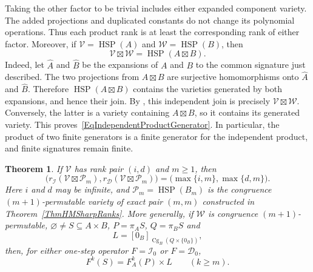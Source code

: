 \documentclass[12pt,english]{amsart}
\newtheorem{theorem}{Theorem}[section]
\theoremstyle{definition}
\numberwithin{equation}{section}
\theoremstyle{remark}
\begin{document}
Taking the other factor to be trivial includes either expanded
component variety. The added projections and duplicated constants
do not change its polynomial operations. Thus each product rank
is at least the corresponding rank of either factor. Moreover,
if $\mathcal V=\operatorname{HSP}(A)$ and
$\mathcal W=\operatorname{HSP}(B)$, then
\begin{equation}\label{EqIndependentProductGenerator}
\mathcal V\boxtimes\mathcal W
=\operatorname{HSP}(A\boxtimes B).
\end{equation}
Indeed, let $\widehat A$ and $\widehat B$ be the expansions of $A$ and
$B$ to the common signature just described. The two projections from
$A\boxtimes B$ are surjective homomorphisms onto $\widehat A$ and
$\widehat B$. Therefore $\operatorname{HSP}(A\boxtimes B)$ contains
the varieties generated by both expansions, and hence their join.
By \cite[Theorem~1]{GLP69}, this independent join is precisely
$\mathcal V\boxtimes\mathcal W$. Conversely, the latter is a variety
containing $A\boxtimes B$, so it contains its generated variety.
This proves~\eqref{EqIndependentProductGenerator}. In particular, the
product of two finite generators is a finite generator for the
independent product, and finite signatures remain finite. 

\begin{theorem}\label{ThmPermutableProductRanks}
If $\mathcal V$ has rank pair $(i,d)$ and $m\geqslant1$, then
\[
\bigl(r_{\mathcal I}(\mathcal V\boxtimes\mathcal P_m),
r_{\mathcal D}(\mathcal V\boxtimes\mathcal P_m)\bigr)
=\bigl(\max\{i,m\},\max\{d,m\}\bigr).
\]
Here $i$ and $d$ may be infinite, and $\mathcal P_m=\operatorname{HSP}(B_m)$
is the congruence $(m+1)$-permutable variety of exact pair $(m,m)$
constructed in Theorem~\ref{ThmHMSharpRanks}.
More generally, if $\mathcal W$
is congruence $(m+1)$-permutable, $\varnothing\ne S\subseteq A\times B$,
$P=\pi_A S$, $Q=\pi_B S$ and
\[
L=[0_B]_{\operatorname{Cg}_B(Q\times\{0_B\})},
\]
then, for either one-step operator $F=\mathcal I_0$ or
$F=\mathcal D_0$,
\begin{equation}\label{EqProductRectangularization}
F^k(S)=F_A^k(P)\times L\qquad(k\geqslant m).
\end{equation}
\end{theorem}
\end{document}

